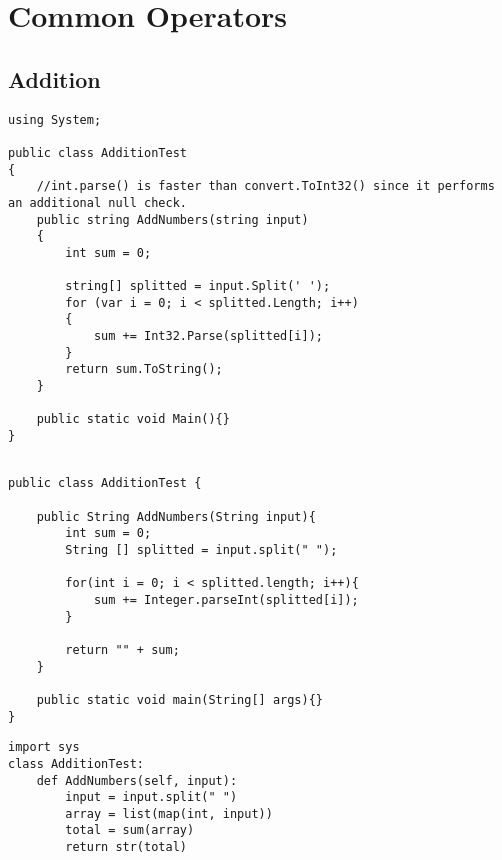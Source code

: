 \section{Common Operators}

\subsection{Addition} \label{appendix:code_addition}

	\lstset{style=sharpc}
	\begin{lstlisting}
using System;

public class AdditionTest
{
    //int.parse() is faster than convert.ToInt32() since it performs an additional null check.
    public string AddNumbers(string input)
    {
        int sum = 0;

        string[] splitted = input.Split(' ');
        for (var i = 0; i < splitted.Length; i++)
        {
            sum += Int32.Parse(splitted[i]);
        }
        return sum.ToString();
    }

    public static void Main(){}
}

	\end{lstlisting}

	\lstset{style=java}
	\begin{lstlisting}

public class AdditionTest {

	public String AddNumbers(String input){
		int sum = 0;
		String [] splitted = input.split(" ");

		for(int i = 0; i < splitted.length; i++){
			sum += Integer.parseInt(splitted[i]);
		}

		return "" + sum;
	}

	public static void main(String[] args){}
}

	\end{lstlisting}

	\lstset{style=python}
	\begin{lstlisting}
import sys
class AdditionTest:
    def AddNumbers(self, input):
        input = input.split(" ")
        array = list(map(int, input))
        total = sum(array)
        return str(total)
	\end{lstlisting}



